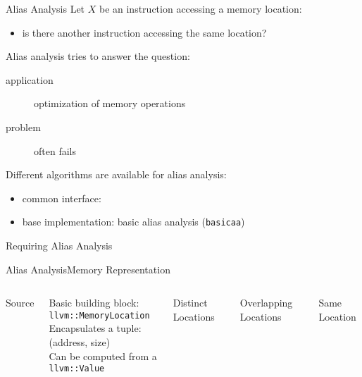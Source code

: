 \begin{frame}{Alias Analysis}
Let $X$ be an instruction accessing a memory location:

\begin{itemize}
\item is there another instruction accessing the same location?
\end{itemize}

\vfill
Alias analysis tries to answer the question:

\begin{description}
\item[application] optimization of memory operations
\item[problem] often fails
\end{description}

\vfill
Different algorithms are available for alias analysis:

\begin{itemize}
\item common interface: 
\item base implementation: basic alias analysis (\texttt{basicaa})
\end{itemize}

\begin{block}{Requiring Alias Analysis}
\centering
{}
\end{block}
\end{frame}


\begin{frame}{Alias Analysis}{Memory Representation}
\begin{columns}
\begin{block}{Source}
\centering
{}
\end{block}

\centering
Basic building block:\\\texttt{llvm::MemoryLocation}\\
\medskip
Encapsulates a tuple:\\(\alert{address}, \alert{size})\\
\medskip
Can be computed from a \texttt{llvm::Value}

\begin{block}{Distinct Locations}
\centering

\end{block}

\begin{block}{Overlapping Locations}
\centering

\end{block}

\begin{block}{Same Location}
\centering

\end{block}

\end{columns}
\end{frame}


